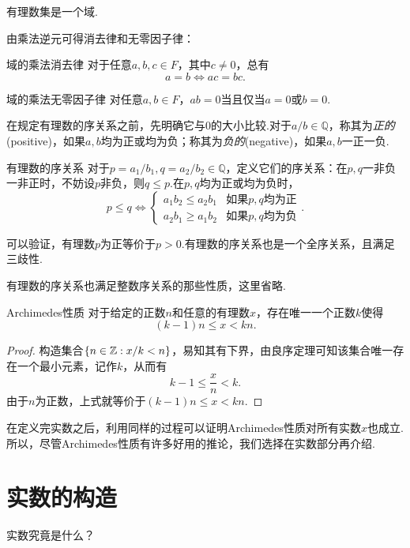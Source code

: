 有理数集是一个域.

由乘法逆元可得消去律和无零因子律：

\begin{proposition}{域的乘法消去律}
	对于任意$a,b,c \in F$，其中$c \neq 0$，总有$$a=b \Leftrightarrow ac=bc.$$
\end{proposition}

\begin{corollary}{域的乘法无零因子律}
	对任意$a,b \in F$，$ab=0$当且仅当$a=0$或$b=0$.
\end{corollary}

在规定有理数的序关系之前，先明确它与$0$的大小比较.对于$a/b \in \mathbb{Q}$，称其为\textit{正的}(positive)，如果$a,b$均为正或均为负；称其为\textit{负的}(negative)，如果$a,b$一正一负.

\begin{definition}{有理数的序关系}
	对于$p=a_1/b_1,q=a_2/b_2 \in \mathbb{Q}$，定义它们的序关系：在$p,q$一非负一非正时，不妨设$p$非负，则$q \leq p$.在$p,q$均为正或均为负时，
	$$p \leq q \Leftrightarrow \begin{cases}
		a_1b_2 \leq a_2b_1 & \textit{如果$p,q$均为正} \\
		a_2b_1 \geq a_1b_2 & \textit{如果$p,q$均为负}
	\end{cases}.$$
\end{definition}

可以验证，有理数$p$为正等价于$p>0$.有理数的序关系也是一个全序关系，且满足三歧性.

有理数的序关系也满足整数序关系的那些性质，这里省略.

\begin{theorem}{Archimedes性质}
	对于给定的正数$n$和任意的有理数$x$，存在唯一一个正数$k$使得$$(k-1)n \leq x < kn.$$
\end{theorem}
\begin{proof}
	构造集合$\{ n \in \mathbb{Z} : x/k <n \}$，易知其有下界，由良序定理可知该集合唯一存在一个最小元素，记作$k$，从而有$$k-1 \leq \frac{x}{n} < k.$$
	由于$n$为正数，上式就等价于$(k-1)n \leq x < kn$.
\end{proof}

在定义完实数之后，利用同样的过程可以证明Archimedes性质对所有实数$x$也成立.所以，尽管Archimedes性质有许多好用的推论，我们选择在实数部分再介绍.

\section{实数的构造}

实数究竟是什么？

